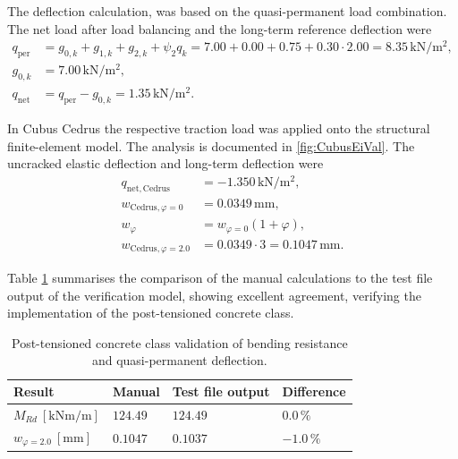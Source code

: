 The deflection calculation, was based on the quasi-permanent load combination. The net load after load balancing and the long-term reference deflection were
\begin{equation}
\begin{aligned}
q_{\mathrm{per}}
&=
g_{0,k}+g_{1,k}+g_{2,k}+\psi_2 q_k
=
7.00+0.00+0.75+0.30\cdot2.00
=
8.35\,\mathrm{kN/m^2},\\
g_{0,k}
&=
7.00\,\mathrm{kN/m^2},\\
q_{\mathrm{net}}
&=
q_{\mathrm{per}}-g_{0,k}
=
1.35\,\mathrm{kN/m^2}.
\end{aligned}
\end{equation}

In Cubus Cedrus the respective traction load was applied onto the structural finite-element model. The analysis is documented in \ref{fig:CubusEiVal}. The uncracked elastic deflection and long-term deflection were
\begin{equation}
\begin{aligned}
q_{\mathrm{net,Cedrus}}
&=
-1.350\,\mathrm{kN/m^2},\\
w_{\mathrm{Cedrus},\varphi=0}
&=
0.0349\,\mathrm{mm},\\
w_{\varphi}
&=
w_{\varphi=0}(1+\varphi),\\
w_{\mathrm{Cedrus},\varphi=2.0}
&=
0.0349\cdot3
=
0.1047\,\mathrm{mm}.
\end{aligned}
\end{equation}


Table \ref{tab:pt_verification_methods} summarises the comparison of the manual calculations to the test file output of the verification model, showing excellent agreement, verifying the implementation of the post-tensioned concrete class.

\begin{table}[H]
    \centering
    \begingroup
    \scriptsize
    \caption{Post-tensioned concrete class validation of bending resistance and quasi-permanent deflection. \label{tab:pt_verification_methods}}
    \setlength{\tabcolsep}{3.5pt}
    \renewcommand{\arraystretch}{1.2}
    \begin{tabularx}{\textwidth}{@{}>{\raggedright\arraybackslash}X|>{\centering\arraybackslash}X|>{\centering\arraybackslash}X|>{\centering\arraybackslash}X@{}}
    \hline
    \textbf{Result} &
    \textbf{Manual} &
    \textbf{Test file output} &
    \textbf{Difference} \\
    \hline
    $M_{Rd}\ [\mathrm{kNm/m}]$ & $124.49$ & $124.49$ & $0.0\,\%$ \\
    $w_{\varphi=2.0} \ [\mathrm{mm}]$& $0.1047$ & $0.1037$ & $-1.0\,\%$ \\
    \hline
    \end{tabularx}
    \endgroup
\end{table}

